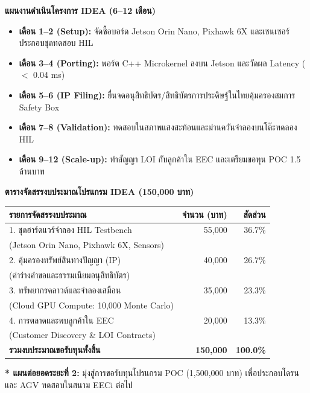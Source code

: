 \documentclass[11pt]{article}
\begin{document}
\begin{minipage}[t]{0.48\textwidth}
  \begin{tcolorbox}[colback=white,colframe=primary,arc=2mm,top=3mm,bottom=3mm]
    \textbf{\textcolor{primary}{แผนงานดำเนินโครงการ IDEA (6--12 เดือน)}}
    \vspace{1.5mm}
    \begin{itemize}[leftmargin=4mm,itemsep=1.5mm]
      \item \textbf{เดือน 1--2 (Setup):} จัดซื้อบอร์ด Jetson Orin Nano, Pixhawk 6X และเซนเซอร์ประกอบชุดทดสอบ HIL
      \item \textbf{เดือน 3--4 (Porting):} พอร์ต C++ Microkernel ลงบน Jetson และวัดผล Latency ($<$ 0.04 ms)
      \item \textbf{เดือน 5--6 (IP Filing):} ยื่นจดอนุสิทธิบัตร/สิทธิบัตรการประดิษฐ์ในไทยคุ้มครองสมการ Safety Box
      \item \textbf{เดือน 7--8 (Validation):} ทดสอบในสภาพแสงสะท้อนและม่านควันจำลองบนโต๊ะทดลอง HIL
      \item \textbf{เดือน 9--12 (Scale-up):} ทำสัญญา LOI กับลูกค้าใน EEC และเตรียมขอทุน POC 1.5 ล้านบาท
    \end{itemize}
  \end{tcolorbox}
\end{minipage}
\hfill
\begin{minipage}[t]{0.48\textwidth}
  \begin{tcolorbox}[colback=lightbg,colframe=accent,arc=2mm,top=3mm,bottom=3mm]
    \textbf{\textcolor{primary}{ตารางจัดสรรงบประมาณโปรแกรม IDEA (150,000 บาท)}}
    \vspace{1.5mm}
    \small
    \begin{tabularx}{\textwidth}{Xrr}
      \textbf{รายการจัดสรรงบประมาณ} & \textbf{จำนวน (บาท)} & \textbf{สัดส่วน} \\
      \midrule
      1. ชุดฮาร์ดแวร์จำลอง HIL Testbench & 55,000 & 36.7\% \\
      \quad (Jetson Orin Nano, Pixhawk 6X, Sensors) & & \\
      2. คุ้มครองทรัพย์สินทางปัญญา (IP) & 40,000 & 26.7\% \\
      \quad (ค่าร่างคำขอและธรรมเนียมอนุสิทธิบัตร) & & \\
      3. ทรัพยากรคลาวด์และจำลองเสมือน & 35,000 & 23.3\% \\
      \quad (Cloud GPU Compute: 10,000 Monte Carlo) & & \\
      4. การตลาดและพบลูกค้าใน EEC & 20,000 & 13.3\% \\
      \quad (Customer Discovery \& LOI Contracts) & & \\
      \midrule
      \textbf{รวมงบประมาณขอรับทุนทั้งสิ้น} & \textbf{150,000} & \textbf{100.0\%} \\
    \end{tabularx}
    \vspace{1.5mm}
    \footnotesize \textbf{\textcolor{secondary}{* แผนต่อยอดระยะที่ 2:}} มุ่งสู่การขอรับทุนโปรแกรม POC (1,500,000 บาท) เพื่อประกอบโดรนและ AGV ทดสอบในสนาม EECi ต่อไป
  \end{tcolorbox}
\end{minipage}
\end{document}
